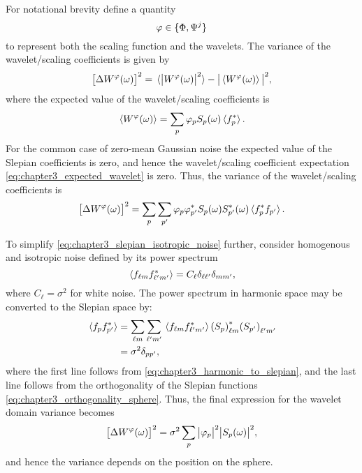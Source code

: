 For notational brevity define a quantity
%
\begin{equation}\label{eq:chapter3_scaling_and_wavelet}
	\varphi \in \set{\Phi,\Psi^{j}}
\end{equation}
%
to represent both the scaling function and the wavelets.
The variance of the wavelet/scaling coefficients is given by
%
\begin{equation}
	\variance{\pixel{W^{\varphi}}}
	= \expval*{\abs{\pixel{W^{\varphi}}}^{2}}
	-\abs{\expval*{\pixel{W^{\varphi}}}}^{2},
\end{equation}
%
where the expected value of the wavelet/scaling coefficients is
%
\begin{equation}\label{eq:chapter3_expected_wavelet}
	\expval*{\pixel{W^{\varphi}}}
	= \slepianSum \slepian{\varphi} \pixel{\slepian{S}} \expval*{\conj{\slepian{f}}}.
\end{equation}
%
For the common case of zero-mean Gaussian noise the expected value of the Slepian coefficients is zero, and hence the wavelet/scaling coefficient expectation \cref{eq:chapter3_expected_wavelet} is zero.
Thus, the variance of the wavelet/scaling coefficients is
%
\begin{equation}\label{eq:chapter3_slepian_isotropic_noise}
	\variance{\pixel{W^{\varphi}}}
	= \slepianSum \slepianSum['] \slepian{\varphi} \conj{\slepian[']{\varphi}} \pixel{\slepian{S}} \pixel{\conj{\slepian[']{S}}} \expval*{\conj{\slepian{f}} \slepian[']{f}}.
\end{equation}

To simplify \cref{eq:chapter3_slepian_isotropic_noise} further, consider homogenous and isotropic noise defined by its power spectrum
%
\begin{equation}
	\expval*{\harmonic{f} \conj{\harmonic[']{f}}}
	= C_{\ell} \delta_{\ell\ell'} \delta_{mm'},
\end{equation}
%
where \(C_{\ell} = \sigma^{2}\) for white noise.
The power spectrum in harmonic space may be converted to the Slepian space by:
%
\begin{align}
	\expval*{\slepian{f} \conj{\slepian[']{f}}}
	 & = \harmonicSum \harmonicSum['] \expval*{\harmonic{f} \conj{\harmonic[']{f}}} \conj{\harmonic{(\slepian{S})}} \harmonic[']{(\slepian[']{S})} \nonumber \\
	 & = \sigma^{2} \delta_{pp'},
\end{align}
%
where the first line follows from \cref{eq:chapter3_harmonic_to_slepian}, and the last line follows from the orthogonality of the Slepian functions \cref{eq:chapter3_orthogonality_sphere}.
Thus, the final expression for the wavelet domain variance becomes
%
\begin{equation}\label{eq:chapter3_wavelet_variance}
	\variance{\pixel{W^{\varphi}}}
	= \sigma^{2} \slepianSum \abs{\slepian{\varphi}}^{2} \abs{\pixel{\slepian{S}}}^{2},
\end{equation}
%
and hence the variance depends on the position on the sphere.

